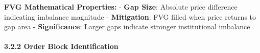 \begin{Shaded}
\begin{Highlighting}[]
        \OperatorTok{\textless{}}\OperatorTok{\textless{}}
\OperatorTok{=} \OperatorTok{{-}}
                \NormalTok{: }\NormalTok{,}
                \NormalTok{: }
\NormalTok{            \})}

\end{Highlighting}
\end{Shaded}

\textbf{FVG Mathematical Properties:} - \textbf{Gap Size}: Absolute
price difference indicating imbalance magnitude - \textbf{Mitigation}:
FVG filled when price returns to gap area - \textbf{Significance}:
Larger gaps indicate stronger institutional imbalance

\paragraph{3.2.2 Order Block
Identification}\label{order-block-identification}

